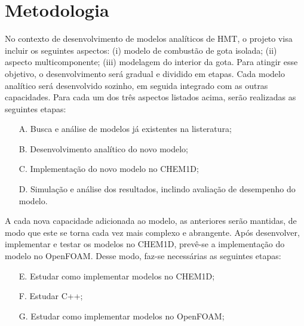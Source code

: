 \section{Metodologia}


No contexto de desenvolvimento de modelos analíticos de HMT, o projeto visa  incluir os seguintes aspectos:
(i) modelo de combustão de gota isolada;
(ii) aspecto multicomponente; 
(iii) modelagem do interior da gota. 
Para atingir esse objetivo, o desenvolvimento será gradual e dividido em etapas. 
Cada modelo analítico será desenvolvido sozinho, em seguida integrado com as outras capacidades.
Para cada um dos três aspectos listados acima, serão realizadas as seguintes etapas:
\begin{enumerate}
    \item[A.] Busca e análise de modelos já existentes na listeratura;
    \item[B.] Desenvolvimento analítico do novo modelo;
    \item[C.] Implementação do novo modelo no CHEM1D;
    \item[D.] Simulação e análise dos resultados, inclindo avaliação de desempenho do modelo.
\end{enumerate}
A cada nova capacidade adicionada ao modelo, as anteriores serão mantidas, de modo que este se torna cada vez mais complexo e abrangente. 
Após desenvolver, implementar e testar os modelos no CHEM1D, prevê-se a implementação do modelo no OpenFOAM. Desse modo, faz-se necessárias as seguintes etapas:
\begin{itemize}
    \item[E.] Estudar como implementar modelos no CHEM1D; 
    \item[F.] Estudar C++; 
    \item[G.] Estudar como implementar modelos no OpenFOAM; 
\end{itemize}

